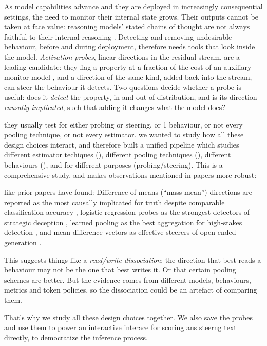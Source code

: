 

As model capabilities advance and they are deployed in increasingly
consequential settings, the need to monitor their internal state grows.
Their outputs cannot be taken at face value: reasoning models' stated
chains of thought are not always faithful to their internal reasoning
\citep{chen2025}. Detecting and removing undesirable behaviour, before and
during deployment, therefore needs tools that look inside the model.
\emph{Activation probes}, linear directions in the residual stream, are a
leading candidate: they flag a property at a fraction of the cost of an
auxiliary monitor model \citep{alain2018,mckenzie2025}, and a direction of
the same kind, added back into the stream, can steer the behaviour it
detects. Two questions decide whether a probe is useful: does it
\emph{detect} the property, in and out of distribution, and is its
direction \emph{causally implicated}, such that adding it changes what the
model does?

they usually test for either probing or steering, or 1 behaviour, or not every pooling technique, or not every estimator.
we wanted to study how all these design choices interact, and therefore built a unified pipeline
which studies different estimator techiques (), different pooling techniques (), different behaviours (), and for different purposes (probing/steering).
This is a comprehensive study, and makes observations mentioned in papers more robust:

like prior papers have found: 
Difference-of-means
(``mass-mean'') directions are reported as the most causally implicated for
truth despite comparable classification accuracy \citep{marks2024},
logistic-regression probes as the strongest detectors of strategic
deception \citep{goldowsky2025}, learned pooling as the best aggregation
for high-stakes detection \citep{mckenzie2025}, and mean-difference vectors
as effective steerers of open-ended generation \citep{rimsky2024}. 

This suggests things like a \emph{read/write dissociation}: the direction
that best reads a behaviour may not be the one that best writes it. Or that certain pooling schemes are better. 
But the
evidence comes from different models, behaviours, metrics and token
policies, so the dissociation could be an artefact of comparing them.

That's why we study all these design choices together. We also save the probes and use them to 
power an interactive interace for scoring ans steerng text directly, to democratize the inference process.

